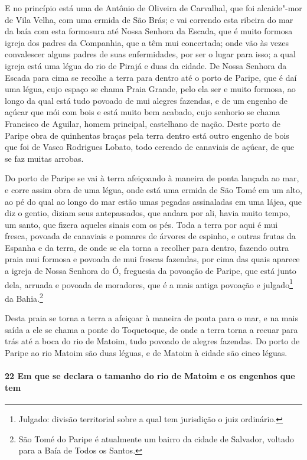 E no princípio está uma de Antônio de Oliveira de Carvalhal, que foi alcaide"-mor de Vila
Velha, com uma ermida de São Brás; e vai correndo esta ribeira do mar da baía com esta
formosura até Nossa \EP[1] Senhora da Escada, que é muito formosa igreja dos padres da
Companhia, que a têm mui concertada; onde vão às vezes convalescer alguns padres de suas
enfermidades, por ser o lugar para isso; a qual igreja está uma légua do rio de Pirajá e
duas da cidade. De Nossa Senhora da Escada para cima se recolhe a terra para dentro até o
porto de Paripe, que é daí uma légua, cujo espaço se chama Praia Grande, pelo ela ser e
muito formosa, ao longo da qual está tudo povoado de mui alegres fazendas, e de um engenho
de açúcar que mói com bois e está muito bem acabado, cujo senhorio se chama Francisco de
Aguilar, homem principal, castelhano de nação. Deste porto de Paripe obra de quinhentas
braças pela terra dentro está outro engenho de bois que foi de Vasco Rodrigues Lobato,
todo cercado de canaviais de açúcar, de que se faz muitas arrobas.

Do porto de Paripe se vai à terra afeiçoando à maneira de ponta lançada ao mar, e corre
assim obra de uma légua, onde está uma ermida de São Tomé em um alto, ao pé do qual ao
longo do mar estão umas pegadas assinaladas em uma lájea, que diz o gentio, diziam seus
antepassados, que andara por ali, havia muito tempo, um santo, que fizera aqueles sinais
com os pés. Toda a terra por aqui é mui fresca, povoada de canaviais e pomares de árvores
de espinho, e outras frutas da Espanha e da terra, de onde se ela torna a recolher para
dentro, fazendo outra praia mui formosa e povoada de mui frescas fazendas, por cima das
quais aparece a igreja de Nossa Senhora do Ó, freguesia da povoação de Paripe, que está
junto dela, arruada e povoada de moradores, que é a mais antiga povoação e
julgado\footnote{ Julgado: divisão territorial sobre a qual tem jurisdição o juiz
ordinário.} da Bahia.\footnote{ São Tomé do Paripe é atualmente um bairro da cidade de
Salvador, voltado para a Baía de Todos os Santos.}

Desta praia se torna a terra a afeiçoar à maneira de ponta para o mar, e na mais saída a
ele se chama a ponte do Toquetoque, de onde a terra torna a recuar para trás até a boca do
rio de Matoim, tudo povoado de alegres fazendas. Do porto de Paripe ao rio Matoim são duas
léguas, e de Matoim à cidade são cinco léguas.

\paragraph{22 Em que se declara o tamanho do rio de Matoim e os engenhos que tem}

